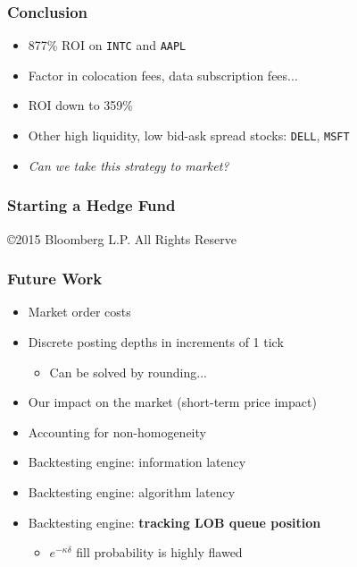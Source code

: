 \begin{frame}
\frametitle{Conclusion}
\begin{itemize}
\item 877\% ROI on \texttt{INTC} and \texttt{AAPL}
\item Factor in colocation fees, data subscription fees...
\item ROI down to 359\%
\item Other high liquidity, low bid-ask spread stocks: \texttt{DELL}, \texttt{MSFT}
\item \emph{Can we take this strategy to market?}
\end{itemize}
\end{frame}

\begin{frame}
\frametitle{Starting a Hedge Fund}
\begin{center}
\end{center}
{\tiny ©2015 Bloomberg L.P. All Rights Reserve}
\end{frame}

\begin{frame}
\frametitle{Future Work}
\begin{itemize}
\item Market order costs
\item Discrete posting depths in increments of 1 tick
\begin{itemize}
\item Can be solved by rounding...
\end{itemize}
\item Our impact on the market (short-term price impact)
\item Accounting for non-homogeneity
\item Backtesting engine: information latency
\item Backtesting engine: algorithm latency
\item Backtesting engine: {\bf tracking LOB queue position}
\begin{itemize}
\item $e^{-\kappa \delta}$ fill probability is highly flawed
\end{itemize}
\end{itemize}
\end{frame}